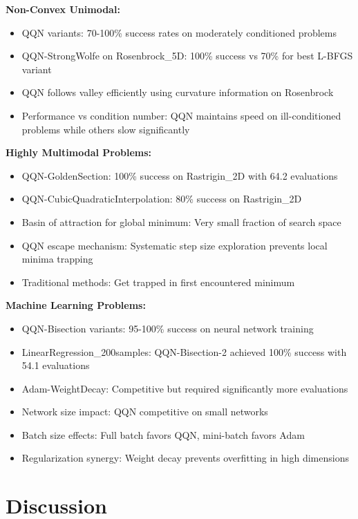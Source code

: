 \textbf{Non-Convex Unimodal:}

\begin{itemize}
\tightlist
\item
  QQN variants: 70-100\% success rates on moderately conditioned problems
\item
  QQN-StrongWolfe on Rosenbrock\_5D: 100\% success vs 70\% for best L-BFGS variant
\item
  QQN follows valley efficiently using curvature information on Rosenbrock
\item
  Performance vs condition number: QQN maintains speed on ill-conditioned problems while others slow significantly
\end{itemize}

\textbf{Highly Multimodal Problems:}

\begin{itemize}
\tightlist
\item
  QQN-GoldenSection: 100\% success on Rastrigin\_2D with 64.2 evaluations
\item
  QQN-CubicQuadraticInterpolation: 80\% success on Rastrigin\_2D
\item
  Basin of attraction for global minimum: Very small fraction of search space
\item
  QQN escape mechanism: Systematic step size exploration prevents local minima trapping
\item
  Traditional methods: Get trapped in first encountered minimum
\end{itemize}

\textbf{Machine Learning Problems:}

\begin{itemize}
\tightlist
\item
  QQN-Bisection variants: 95-100\% success on neural network training
\item
  LinearRegression\_200samples: QQN-Bisection-2 achieved 100\% success with 54.1 evaluations
\item
  Adam-WeightDecay: Competitive but required significantly more evaluations
\item
  Network size impact: QQN competitive on small networks
\item
  Batch size effects: Full batch favors QQN, mini-batch favors Adam
\item
  Regularization synergy: Weight decay prevents overfitting in high dimensions
\end{itemize}

\hypertarget{discussion}{%
\section{Discussion}\label{discussion}}

